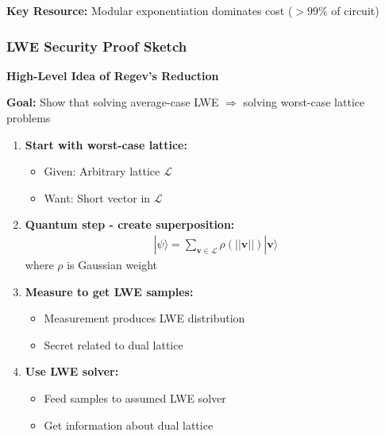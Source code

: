 \documentclass[aspectratio=169,10pt]{beamer}
\newcommand{\teaching}[1]{}
\newcommand{\slideheader}[1]{\frametitle{#1}}
\theoremstyle{plain}
\begin{document}
\begin{frame}
  \vspace{0.3cm}
  
  \begin{blueBox}
    \textbf{Key Resource:} Modular exponentiation dominates cost ($>99\%$ of circuit)
  \end{blueBox}
  
  \teaching{Technical deep dive for interested students}
\end{frame}

\begin{frame}
  \slideheader{LWE Security Proof Sketch}
  
  \begin{center}
    \textbf{\large High-Level Idea of Regev's Reduction}
  \end{center}
  
  \vspace{0.5cm}
  
  \textbf{Goal:} Show that solving average-case LWE $\Rightarrow$ solving worst-case lattice problems
  
  \vspace{0.3cm}
  
  \begin{enumerate}
    \item \textbf{Start with worst-case lattice:}
    \begin{itemize}
      \item Given: Arbitrary lattice $\mathcal{L}$
      \item Want: Short vector in $\mathcal{L}$
    \end{itemize}
    
    \item \textbf{Quantum step - create superposition:}
    \begin{align}
      |\psi\rangle = \sum_{\mathbf{v} \in \mathcal{L}} \rho(||\mathbf{v}||) |\mathbf{v}\rangle
    \end{align}
    where $\rho$ is Gaussian weight
    
    \item \textbf{Measure to get LWE samples:}
    \begin{itemize}
      \item Measurement produces LWE distribution
      \item Secret related to dual lattice
    \end{itemize}
    
    \item \textbf{Use LWE solver:}
    \begin{itemize}
      \item Feed samples to assumed LWE solver
      \item Get information about dual lattice
    \end{itemize}
    

\end{enumerate}
\end{frame}
\end{document}
